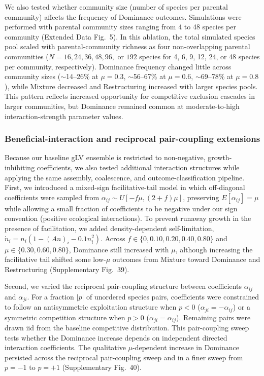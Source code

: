 We also tested whether community size (number of species per parental community) affects the frequency of Dominance outcomes. Simulations were performed with parental community sizes ranging from 4 to 48 species per community (Extended Data Fig.~5). In this ablation, the total simulated species pool scaled with parental-community richness as four non-overlapping parental communities ($N=16, 24, 36, 48, 96,$ or $192$ species for 4, 6, 9, 12, 24, or 48 species per community, respectively). Dominance frequency changed little across community sizes ($\sim$14--26\% at $\mu=0.3$, $\sim$56--67\% at $\mu=0.6$, $\sim$69--78\% at $\mu=0.8$), while Mixture decreased and Restructuring increased with larger species pools. This pattern reflects increased opportunity for competitive exclusion cascades in larger communities, but Dominance remained common at moderate-to-high interaction-strength parameter values.

\subsubsection*{Beneficial-interaction and reciprocal pair-coupling extensions}

Because our baseline gLV ensemble is restricted to non-negative, growth-inhibiting coefficients, we also tested additional interaction structures while applying the same assembly, coalescence, and outcome-classification pipeline. First, we introduced a mixed-sign facilitative-tail model in which off-diagonal coefficients were sampled from $\alpha_{ij}\sim U[-f\mu,(2+f)\mu]$, preserving $E[\alpha_{ij}]=\mu$ while allowing a small fraction of coefficients to be negative under our sign convention (positive ecological interactions). To prevent runaway growth in the presence of facilitation, we added density-dependent self-limitation, $\dot n_i=n_i(1-(A n)_i-0.1n_i^2)$. Across $f \in \{0,0.10,0.20,0.40,0.80\}$ and $\mu \in \{0.30,0.60,0.80\}$, Dominance still increased with $\mu$, although increasing the facilitative tail shifted some low-$\mu$ outcomes from Mixture toward Dominance and Restructuring (Supplementary Fig.~39).

Second, we varied the reciprocal pair-coupling structure between coefficients $\alpha_{ij}$ and $\alpha_{ji}$. For a fraction $|p|$ of unordered species pairs, coefficients were constrained to follow an antisymmetric exploitation structure when $p<0$ ($\alpha_{ji}=-\alpha_{ij}$) or a symmetric competition structure when $p>0$ ($\alpha_{ji}=\alpha_{ij}$). Remaining pairs were drawn iid from the baseline competitive distribution. This pair-coupling sweep tests whether the Dominance increase depends on independent directed interaction coefficients. The qualitative $\mu$-dependent increase in Dominance persisted across the reciprocal pair-coupling sweep and in a finer sweep from $p=-1$ to $p=+1$ (Supplementary Fig.~40).

